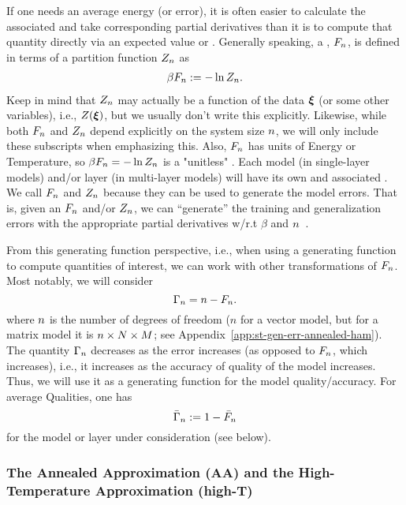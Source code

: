If one needs an average energy (or error), 
it is often easier to calculate the associated \FreeEnergy and take corresponding partial derivatives
than it is to compute that quantity directly via an expected value or \ThermalAverage.
Generally speaking, a \FreeEnergy, $F_{n}$, is defined in terms of a partition function $Z_{n}$ as
\begin{align}
\label{eqn:F}
\beta F_{n}:=-\ln Z_{n}.
\end{align}
Keep in mind that $Z_{n}$ may actually be a function of the data $\boldsymbol{\xi}$ (or some other variables),
i.e., $Z(\boldsymbol{\xi})$, but we usually don't write this explicitly.
Likewise, while  both $F_{n}$ and $Z_{n}$ depend explicitly on the system size $n$,
we will only include these subscripts when emphasizing this.
Also, $F_{n}$ has units of Energy or Temperature, so $\beta F_{n}=-\ln Z_{n}$ is a "unitless" \FreeEnergy.
%
Each model (in single-layer models) and/or layer (in multi-layer models) will have its own \PartitionFunction and associated \GeneratingFunctions.
We call $F_{n}$ and $Z_{n}$ \emph{\GeneratingFunctions} because they can be used to generate the model errors. 
That is, given an $F_{n}$ and/or $Z_{n}$, we can ``generate'' the training and generalization errors with the appropriate partial derivatives w/r.t $\beta$ and $n$~\cite{LTS90, Solla2023}.

From this generating function perspective, i.e., when using a generating function to compute quantities of interest, we can work with other transformations of $F_{n}$.
Most notably, we will consider 
\begin{equation}
    \Gamma_{n} = n-F_{n} .
\end{equation}
where $n$ is the number of degrees of freedom ($n$ for a vector model, but for a  matrix model it is $n\times N\times M$; see Appendix~\ref{app:st-gen-err-annealed-ham}).
The quantity $\Gamma_{n}$ decreases as the error increases (as opposed to $F_{n}$, which increases), i.e., it increases as the accuracy of quality of the model increases.
Thus, we will use it as a generating function for the model quality/accuracy.  
For average Qualities, one has
\begin{equation} 
\label{eqn:GammaBar}
 \bar{\Gamma}_{n}:=1-\bar{F}_{n}
\end{equation} %
for the model or layer under consideration (see below).

\subsubsection{The Annealed Approximation (AA) and the High-Temperature Approximation (high-T)}
\label{sxn:mathP_annealed}

